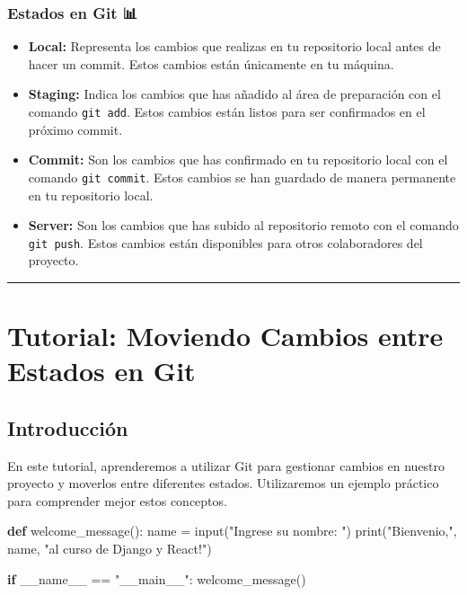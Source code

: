 \documentclass[
  a4paper,
  DIV=11,
  numbers=noendperiod,
  onepage,
  openany]{scrreprt}
\newenvironment{Shaded}{\begin{snugshade}}{\end{snugshade}}
\newcommand{\BuiltInTok}[1]{\textcolor[rgb]{0.00,0.23,0.31}{#1}}
\newcommand{\ControlFlowTok}[1]{\textcolor[rgb]{0.00,0.23,0.31}{\textbf{#1}}}
\newcommand{\KeywordTok}[1]{\textcolor[rgb]{0.00,0.23,0.31}{\textbf{#1}}}
\newcommand{\NormalTok}[1]{\textcolor[rgb]{0.00,0.23,0.31}{#1}}
\newcommand{\OperatorTok}[1]{\textcolor[rgb]{0.37,0.37,0.37}{#1}}
\newcommand{\StringTok}[1]{\textcolor[rgb]{0.13,0.47,0.30}{#1}}
\newcommand{\VariableTok}[1]{\textcolor[rgb]{0.07,0.07,0.07}{#1}}
\providecommand{\tightlist}{%
  \setlength{\itemsep}{0pt}\setlength{\parskip}{0pt}}\usepackage{longtable,booktabs,array}
\begin{document}
\subsection{Estados en Git 📊}\label{estados-en-git}

\begin{itemize}
\tightlist
\item
  \textbf{Local:} Representa los cambios que realizas en tu repositorio
  local antes de hacer un commit. Estos cambios están únicamente en tu
  máquina.
\item
  \textbf{Staging:} Indica los cambios que has añadido al área de
  preparación con el comando \texttt{git\ add}. Estos cambios están
  listos para ser confirmados en el próximo commit.
\item
  \textbf{Commit:} Son los cambios que has confirmado en tu repositorio
  local con el comando \texttt{git\ commit}. Estos cambios se han
  guardado de manera permanente en tu repositorio local.
\item
  \textbf{Server:} Son los cambios que has subido al repositorio remoto
  con el comando \texttt{git\ push}. Estos cambios están disponibles
  para otros colaboradores del proyecto.
\end{itemize}

\begin{center}\rule{0.5\linewidth}{0.5pt}\end{center}

\chapter{Tutorial: Moviendo Cambios entre Estados en Git
📝}\label{tutorial-moviendo-cambios-entre-estados-en-git}

\section{Introducción}\label{introducciuxf3n}

En este tutorial, aprenderemos a utilizar Git para gestionar cambios en
nuestro proyecto y moverlos entre diferentes estados. Utilizaremos un
ejemplo práctico para comprender mejor estos conceptos.

\begin{Shaded}
\begin{Highlighting}[]
\KeywordTok{def}\NormalTok{ welcome\_message():}
\NormalTok{    name }\OperatorTok{=} \BuiltInTok{input}\NormalTok{(}\StringTok{"Ingrese su nombre: "}\NormalTok{)}
    \BuiltInTok{print}\NormalTok{(}\StringTok{"Bienvenio,"}\NormalTok{, name, }\StringTok{"al curso de Django y React!"}\NormalTok{)}

\ControlFlowTok{if} \VariableTok{\_\_name\_\_} \OperatorTok{==} \StringTok{"\_\_main\_\_"}\NormalTok{:}
\NormalTok{    welcome\_message()}
\end{Highlighting}
\end{Shaded}
\end{document}
